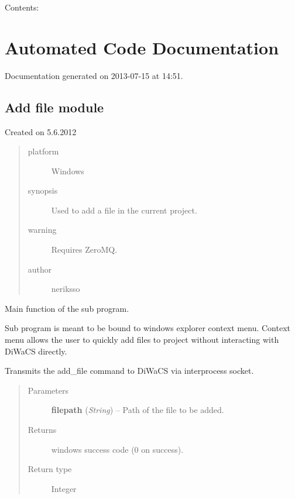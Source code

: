 \documentclass[letterpaper,10pt,english]{sphinxmanual}
\begin{document}
Contents:


\chapter{Automated Code Documentation}
\label{api:automated-code-documentation}\label{api::doc}\label{api:welcome-to-diwacs-documentation}
Documentation generated on 2013-07-15 at 14:51.


\section{Add file module}
\label{add_file:module-add_file}\label{add_file:add-file-module}\label{add_file::doc}
Created on 5.6.2012
\begin{quote}\begin{description}
\item[{platform}] \leavevmode
Windows

\item[{synopsis}] \leavevmode
Used to add a file in the current project.

\item[{warning}] \leavevmode
Requires ZeroMQ.

\item[{author}] \leavevmode
neriksso

\end{description}\end{quote}

\begin{fulllineitems}
\label{add_file:add_file.main}
Main function of the sub program.

Sub program is meant to be bound to windows explorer context menu.
Context menu allows the user to quickly add files to project without
interacting with DiWaCS directly.

Transmits the add\_file command to DiWaCS via interprocess socket.
\begin{quote}\begin{description}
\item[{Parameters}] \leavevmode
\textbf{filepath} (\emph{String}) -- Path of the file to be added.

\item[{Returns}] \leavevmode
windows success code (0 on success).

\item[{Return type}] \leavevmode
Integer

\end{description}\end{quote}

\end{fulllineitems}
\end{document}
